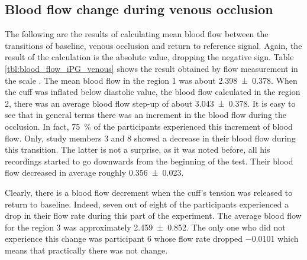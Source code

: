 \subsection{Blood flow change during venous occlusion}
\label{sectio ban5.5.1}
The following are the results of calculating mean blood flow between the transitions of baseline, venous occlusion and return to reference signal. Again, the result of the calculation is the absolute value, dropping the negative sign. Table \ref{tbl:blood_flow_iPG_venous} shows the result obtained by flow measurement in the scale \si{\bfv}. The mean blood flow in the region 1 was about \SI{2.398(0378)}{\bfv}. When the cuff was inflated below diastolic value, the blood flow calculated in the region 2, there was an average blood flow step-up of about \SI{3.043(0378)}{\bfv}. It is easy to see that in general terms there was an increment in the blood flow during the occlusion. In fact, \SI{75}{\percent} of the participants experienced this increment of blood flow. Only, study members 3 and 8 showed a decrease in their blood flow during this transition. The latter is not a surprise, as it was noted before, all his recordings started to go downwards from the beginning of the test. Their blood flow decreased in average roughly \SI{0.356(0023)}{\bfv}.

Clearly, there is a blood flow decrement when the cuff's tension was released to return to baseline. Indeed, seven out of eight of the participants experienced a drop in their flow rate during this part of the experiment. The average blood flow for the region 3 was approximately \SI{2.459(0852)}{\bfv}. The only one who did not experience this change was participant 6 whose flow rate dropped \SI{-0.0101}{\bfv} which means that practically there was not change. 

